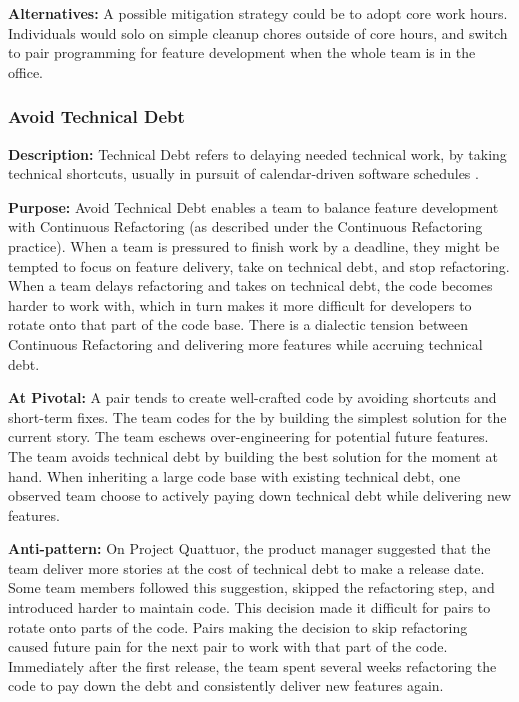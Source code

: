 \textbf{Alternatives:} A possible mitigation strategy could be to adopt core work hours. Individuals would solo on simple cleanup chores outside of core hours, and switch to pair programming for feature development when the whole team is in the office. 

\subsubsection{Avoid Technical Debt}
\textbf{Description:} Technical Debt refers to delaying needed technical work, by taking technical shortcuts, usually in pursuit of calendar-driven software schedules \cite{McConnellTechnicalDebt}. 

\textbf{Purpose:} Avoid Technical Debt enables a team to balance feature development with Continuous Refactoring (as described under the Continuous Refactoring practice). When a team is pressured to finish work by a deadline, they might be tempted to focus on feature delivery, take on technical debt, and stop refactoring. When a team delays refactoring and takes on technical debt, the code becomes harder to work with, which in turn makes it more difficult for developers to rotate onto that part of the code base. There is a dialectic tension \cite{RalphProcessTheories} between Continuous Refactoring and delivering more features while accruing technical debt.

\textbf{At Pivotal:} A pair tends to create well-crafted code by avoiding shortcuts and short-term fixes. The team codes for the  by building the simplest solution for the current story. The team eschews over-engineering for potential future features. The team avoids technical debt by building the best solution for the moment at hand. When inheriting a large code base with existing technical debt, one observed team choose to actively paying down technical debt while delivering new features. 

\textbf{Anti-pattern:} On Project Quattuor, the product manager suggested that the team deliver more stories at the cost of technical debt to make a release date. Some team members followed this suggestion, skipped the refactoring step, and introduced harder to maintain code. This decision made it difficult for pairs to rotate onto parts of the code. Pairs making the decision to skip refactoring caused future pain for the next pair to work with that part of the code. Immediately after the first release, the team spent several weeks refactoring the code to pay down the debt and consistently deliver new features again.

